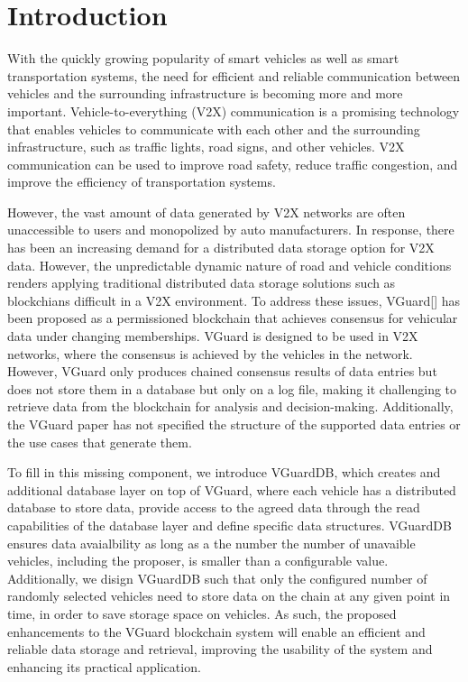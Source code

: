 \section{Introduction}
With the quickly growing popularity of smart vehicles as well as smart transportation systems, the need for efficient and reliable communication between vehicles and the surrounding infrastructure is becoming more and more important. Vehicle-to-everything (V2X) communication is a promising technology that enables vehicles to communicate with each other and the surrounding infrastructure, such as traffic lights, road signs, and other vehicles. V2X communication can be used to improve road safety, reduce traffic congestion, and improve the efficiency of transportation systems. 

However, the vast amount of data generated by V2X networks are often unaccessible to users and monopolized by auto manufacturers. In response, there has been an increasing demand for a distributed data storage option for V2X data. However, the unpredictable dynamic nature of road and vehicle conditions renders applying traditional distributed data storage solutions such as blockchians difficult in a V2X environment. To address these issues, VGuard[] has been proposed as a permissioned blockchain that achieves consensus for vehicular data under changing memberships. VGuard is designed to be used in V2X networks, where the consensus is achieved by the vehicles in the network. However, VGuard only produces chained consensus results of data entries but does not store them in a database but only on a log file, making it challenging to retrieve data from the blockchain for analysis and decision-making. Additionally, the VGuard paper has not specified the structure of the supported data entries or the use cases that generate them. 

To fill in this missing component, we introduce VGuardDB, which creates and additional database layer on top of VGuard, where each vehicle has a distributed database to store data, provide access to the agreed data through the read capabilities of the database layer and define specific data structures. VGuardDB ensures data avaialbility as long as a the number the number of unavaible vehicles, including the proposer, is smaller than a configurable value. Additionally, we disign VGuardDB such that only the configured number of randomly selected vehicles need to store data on the chain at any given point in time, in order to save storage space on vehicles. As such, the proposed enhancements to the VGuard blockchain system will enable an efficient and reliable data storage and retrieval, improving the usability of the system and enhancing its practical application.

